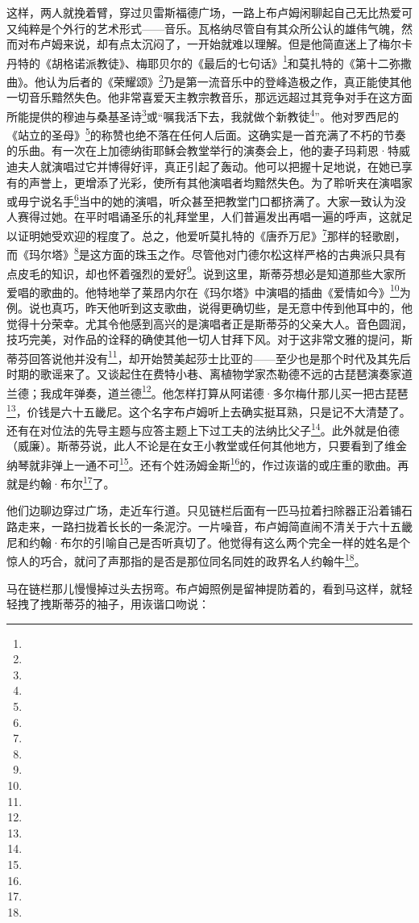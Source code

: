 \par 这样，两人就挽着臂，穿过贝雷斯福德广场，一路上布卢姆闲聊起自己无比热爱可又纯粹是个外行的艺术形式——音乐。瓦格纳尽管自有其众所公认的雄伟气魄，然而对布卢姆来说，却有点太沉闷了，一开始就难以理解。但是他简直迷上了梅尔卡丹特的《胡格诺派教徒》、梅耶贝尔的《最后的七句话》\footnote{}和莫扎特的《第十二弥撒曲》。他认为后者的《荣耀颂》\footnote{}乃是第一流音乐中的登峰造极之作，真正能使其他一切音乐黯然失色。他非常喜爱天主教宗教音乐，那远远超过其竞争对手在这方面所能提供的穆迪与桑基圣诗\footnote{}或“嘱我活下去，我就做个新教徒\footnote{}”。他对罗西尼的《站立的圣母》\footnote{}的称赞也绝不落在任何人后面。这确实是一首充满了不朽的节奏的乐曲。有一次在上加德纳街耶稣会教堂举行的演奏会上，他的妻子玛莉恩·特威迪夫人就演唱过它并博得好评，真正引起了轰动。他可以把握十足地说，在她已享有的声誉上，更增添了光彩，使所有其他演唱者均黯然失色。为了聆听夹在演唱家或毋宁说名手\footnote{}当中的她的演唱，听众甚至把教堂门口都挤满了。大家一致认为没人赛得过她。在平时唱诵圣乐的礼拜堂里，人们普遍发出再唱一遍的呼声，这就足以证明她受欢迎的程度了。总之，他爱听莫扎特的《唐乔万尼》\footnote{}那样的轻歌剧，而《玛尔塔》\footnote{}是这方面的珠玉之作。尽管他对门德尔松这样严格的古典派只具有点皮毛的知识，却也怀着强烈的爱好\footnote{}。说到这里，斯蒂芬想必是知道那些大家所爱唱的歌曲的。他特地举了莱昂内尔在《玛尔塔》中演唱的插曲《爱情如今》\footnote{}为例。说也真巧，昨天他听到这支歌曲，说得更确切些，是无意中传到他耳中的，他觉得十分荣幸。尤其令他感到高兴的是演唱者正是斯蒂芬的父亲大人。音色圆润，技巧完美，对作品的诠释的确使其他一切人甘拜下风。对于这非常文雅的提问，斯蒂芬回答说他并没有\footnote{}，却开始赞美起莎士比亚的——至少也是那个时代及其先后时期的歌谣来了。又谈起住在费特小巷、离植物学家杰勒德不远的古琵琶演奏家道兰德；我成年弹奏，道兰德\footnote{}。他怎样打算从阿诺德·多尔梅什那儿买一把古琵琶\footnote{}，价钱是六十五畿尼。这个名字布卢姆听上去确实挺耳熟，只是记不大清楚了。还有在对位法的先导主题与应答主题上下过工夫的法纳比父子\footnote{}。此外就是伯德（威廉）。斯蒂芬说，此人不论是在女王小教堂或任何其他地方，只要看到了维金纳琴就非弹上一通不可\footnote{}。还有个姓汤姆金斯\footnote{}的，作过诙谐的或庄重的歌曲。再就是约翰·布尔\footnote{}了。
\par 他们边聊边穿过广场，走近车行道。只见链栏后面有一匹马拉着扫除器正沿着铺石路走来，一路扫拢着长长的一条泥泞。一片噪音，布卢姆简直闹不清关于六十五畿尼和约翰·布尔的引喻自己是否听真切了。他觉得有这么两个完全一样的姓名是个惊人的巧合，就问了声那指的是否是那位同名同姓的政界名人约翰牛\footnote{}。
\par 马在链栏那儿慢慢掉过头去拐弯。布卢姆照例是留神提防着的，看到马这样，就轻轻拽了拽斯蒂芬的袖子，用诙谐口吻说：
